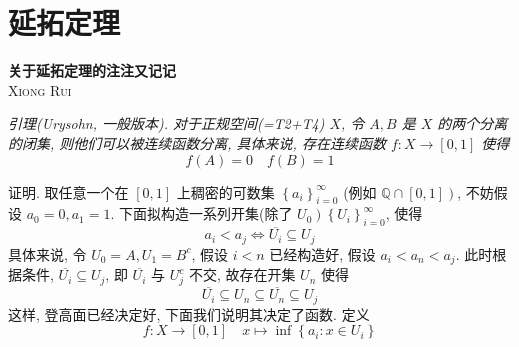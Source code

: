 \documentclass[options]{article}
\begin{document}
\newenvironment{remark}{
	\begin{center}
		\begin{minipage}{0.8\textwidth}\linespread{1.3}\selectfont\itshape}
			{\end{minipage}
	\end{center}
	\vspace*{4pt}}
\newenvironment{en}{}{\switchcolumn}
\newenvironment{cn}{\linespread{1.3}\selectfont}{\switchcolumn*}

\section{延拓定理}

\linespread{1.3}\selectfont
\begin{center}{\bf\Huge{关于延拓定理的注注又记记}}\\
	{\scshape{Xiong Rui}}
\end{center}
\begin{remark}
	引理(Urysohn, 一般版本). 对于正规空间(=T2+T4) $X$, 令 $A, B$ 是 $X$ 的两个分离的闭集, 则他们可以被连续函数分离, 具体来说, 存在连续函数 $f: X \rightarrow[0,1]$ 使得
	\[
			f(A)=0 \quad f(B)=1
	\]
\end{remark}

证明. 取任意一个在 $[0,1]$ 上稠密的可数集 $\left\{a_i\right\}_{i=0}^{\infty}$ (例如 $\left.\mathbb{Q} \cap[0,1]\right)$, 不妨假设 $a_0=0, a_1=1$. 下面拟构造一系列开集(除了 $\left.U_0\right)\left\{U_i\right\}_{i=0}^{\infty}$, 使得
\[
		a_i<a_j \Longleftrightarrow \overline{U_i} \subseteq U_j
\]
具体来说, 令 $U_0=A, U_1=B^c$, 假设 $i<n$ 已经构造好, 假设 $a_i<a_n<a_j$. 此时根据条件, $\overline{U_i} \subseteq U_j$, 即 $\overline{U_i}$ 与 $U_j^c$ 不交, 故存在开集 $U_n$ 使得
\[
		\overline{U_i} \subseteq U_n \subseteq \overline{U_n} \subseteq U_j
\]
这样, 登高面已经决定好, 下面我们说明其决定了函数. 定义
\[
		f: X \longrightarrow[0,1] \quad x \longmapsto \inf \left\{a_i: x \in U_i\right\}
\]
\end{document}

